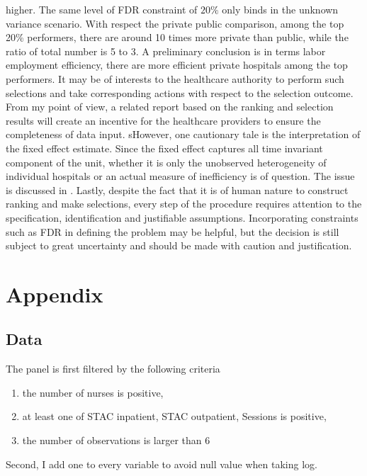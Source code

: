 \documentclass[12pt]{article}
\begin{document}
higher. The same level of FDR constraint of $20\%$ only binds in the unknown
variance scenario. With respect the private public comparison, among the top
20\% performers, there are around 10 times more private than public, while the
ratio of total number is 5 to 3. A preliminary conclusion is in terms labor
employment efficiency, there are more efficient private hospitals among the top
performers. It may be of interests to the healthcare authority to perform such
selections and take corresponding actions with respect to the selection
outcome. From my point of view, a related report based on the ranking and
selection results will create an incentive for the healthcare providers to
ensure the completeness of data input. sHowever, one cautionary tale is the
interpretation of the fixed effect estimate. Since the fixed effect captures
all time invariant component of the unit, whether it is only the unobserved
heterogeneity of individual hospitals or an actual measure of inefficiency is
of question. The issue is discussed in \citet{greene2005fixed}. Lastly, despite
the fact that it is of human nature to construct ranking and make selections,
every step of the procedure requires attention to the specification,
identification and justifiable assumptions. Incorporating constraints such as
FDR in defining the problem may be helpful, but the decision is still subject
to great uncertainty and should be made with caution and justification.

\pagebreak
\newpage


\appendix
\section{Appendix}
\subsection{Data}

The panel is first filtered by the following criteria
\begin{enumerate}
    \item the number of nurses is positive,
    \item at least one of STAC inpatient, STAC outpatient, Sessions is positive,
    \item the number of observations is larger than 6
\end{enumerate}
Second, I add one to every variable to avoid null value when taking log.
\end{document}

